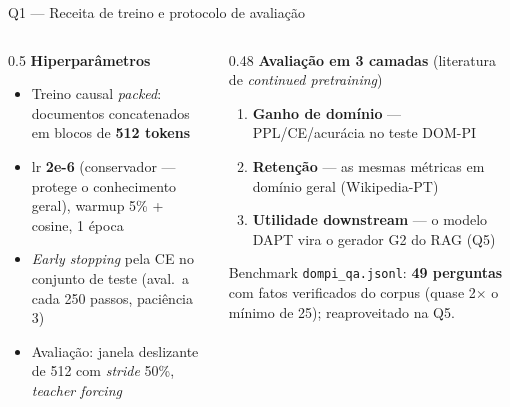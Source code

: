 \documentclass[10pt,aspectratio=169]{beamer}
\begin{document}
\begin{frame}{Q1 — Receita de treino e protocolo de avaliação}
  \begin{columns}[T]
    \begin{column}{0.5\textwidth}
      \textbf{Hiperparâmetros}
      \begin{itemize}\small
        \item Treino causal \emph{packed}: documentos concatenados em blocos de \textbf{512 tokens}
        \item lr \textbf{2e-6} (conservador — protege o conhecimento geral), warmup 5\% + cosine, 1 época
        \item \emph{Early stopping} pela CE no conjunto de teste (aval.\ a cada 250 passos, paciência 3)
        \item Avaliação: janela deslizante de 512 com \emph{stride} 50\%, \emph{teacher forcing}
      \end{itemize}
    \end{column}
    \begin{column}{0.48\textwidth}
      \textbf{Avaliação em 3 camadas} (literatura de \emph{continued pretraining})
      \begin{enumerate}\small
        \item \textbf{Ganho de domínio} — PPL/CE/acurácia no teste DOM-PI
        \item \textbf{Retenção} — as mesmas métricas em domínio geral (Wikipedia-PT)
        \item \textbf{Utilidade downstream} — o modelo DAPT vira o gerador G2 do RAG (Q5)
      \end{enumerate}
      \begin{block}{\small Benchmark}
        \small \texttt{dompi\_qa.jsonl}: \textbf{49 perguntas} com fatos verificados do corpus (quase 2$\times$ o mínimo de 25); reaproveitado na Q5.
      \end{block}
    \end{column}
  \end{columns}
\end{frame}
\end{document}
